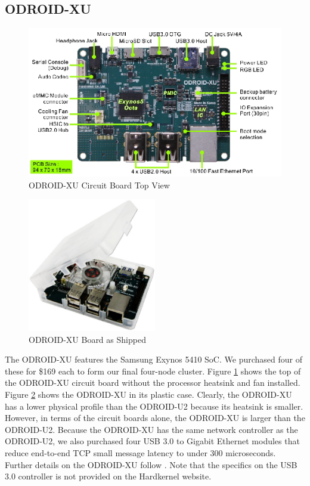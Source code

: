 \documentclass[11pt]{book}
\begin{document}
\subsection{ODROID-XU}

\begin{figure}
\includegraphics[width=\textwidth]{odroid_xu_top}
\caption{ODROID-XU Circuit Board Top View \cite{odroid-xu-board-detail}}
\label{odroid-xu-board}
\end{figure}

\begin{figure}
\centering
\includegraphics[width=0.5\textwidth]{odroid_xu}
\caption{ODROID-XU Board as Shipped \cite{odroid-xu-board-detail}}
\label{odroid-xu}
\end{figure}

The ODROID-XU features the Samsung Exynos 5410 SoC. We purchased four of these for \$169
each to form our final four-node cluster.  Figure \ref{odroid-xu-board} shows the top of
the ODROID-XU circuit board without the processor heatsink and fan installed.  Figure
\ref{odroid-xu} shows the ODROID-XU in its plastic case.  Clearly, the ODROID-XU has a
lower physical profile than the ODROID-U2 because its heatsink is smaller.  However, in
terms of the circuit boards alone, the ODROID-XU is larger than the ODROID-U2. Because the
ODROID-XU has the same network controller as the ODROID-U2, we also purchased four USB 3.0
to Gigabit Ethernet modules that reduce end-to-end TCP small message latency to under 300
microseconds.  Further details on the ODROID-XU follow \cite{odroid-xu-board-detail}. Note
that the specifics on the USB 3.0 controller is not provided on the Hardkernel website.
\end{document}
